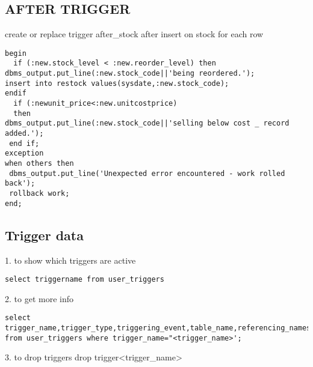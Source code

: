 \subsection{AFTER TRIGGER }

create or replace trigger after_stock
after insert on stock for each row

\begin{framed}
\begin{verbatim}
begin
  if (:new.stock_level < :new.reorder_level) then
dbms_output.put_line(:new.stock_code||'being reordered.');
insert into restock values(sysdate,:new.stock_code);
endif
  if (:newunit_price<:new.unitcostprice)
  then 
dbms_output.put_line(:new.stock_code||'selling below cost _ record added.');
 end if;
exception
when others then 
 dbms_output.put_line('Unexpected error encountered - work rolled back');
 rollback work;
end;
\end{verbatim}
\end{framed}

\subsection*{Trigger data}

1. to show which triggers are active

\texttt{select triggername from user\_triggers}

2. to get more info

\begin{verbatim}
select trigger_name,trigger_type,triggering_event,table_name,referencing_names,trigger_body from user_triggers where trigger_name="<trigger_name>';
\end{verbatim}

3. to drop triggers
drop trigger<trigger_name>
